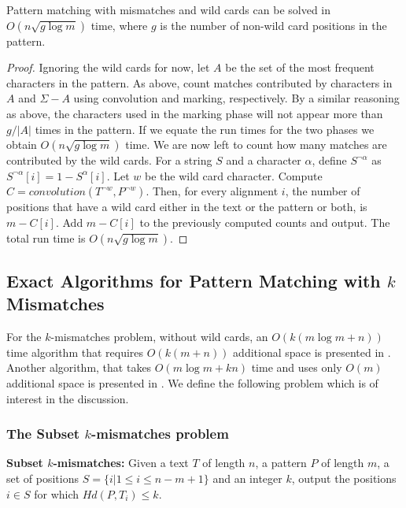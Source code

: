 \begin{theorem}
\label{thm_glogm}
 Pattern matching with mismatches and wild cards can be solved
in $O(n\sqrt{g \log m})$ time, where $g$ is the number of non-wild card
positions in the pattern.
\end{theorem}

\begin{proof}
 Ignoring the wild cards for now, let $A$ be the set of
the most frequent characters in the pattern. As above, count matches contributed
by characters in $A$ and $\Sigma-A$ using convolution and marking, respectively.
By a similar reasoning as above, the characters used in the marking phase will not 
appear more than $g / |A|$ times in the pattern. If we equate the run times for the two 
phases we obtain $O(n \sqrt {g \log m})$ time. We are now left to count how many matches are
contributed by the wild cards. For a string $S$ and a character $\alpha$, define $S^{\neg \alpha}$ as
$S^{\neg \alpha}[i] = 1-S^\alpha[i]$. Let
$w$ be the wild card character. Compute $C = convolution(T^{\neg w}, P^{\neg w})$. Then,
for every alignment $i$, the number of positions that have a wild card either in the
text or the pattern or both, is $m-C[i]$. Add $m-C[i]$ to the previously computed counts and output. 
The total run time is $O(n \sqrt{g \log m})$.
\end{proof}

\subsection{Exact Algorithms for Pattern Matching with $k$ Mismatches}
\label{sec_k_mism_det}

For the $k$-mismatches problem, without wild cards, an $O(k(m\log m+n))$ time
algorithm that requires $O(k(m+n))$ additional space is presented in \cite{LV85}. Another algorithm, that takes
  $O(m\log m + kn)$ time and uses only $O(m)$ additional space is presented
in \cite{GG86}.  We define the following
problem which is of interest in the discussion.

\subsubsection{The Subset $k$-mismatches problem}
\begin{problem}
{\bf Subset $k$-mismatches:} Given a text $T$ of length $n$, a pattern $P$ of
length $m$, a set of positions $S=\{i|1 \leq i \leq n-m+1\}$ and an integer $k$, output the
positions $i \in S$ for which $Hd(P, T_i) \leq k$.
\end{problem}

